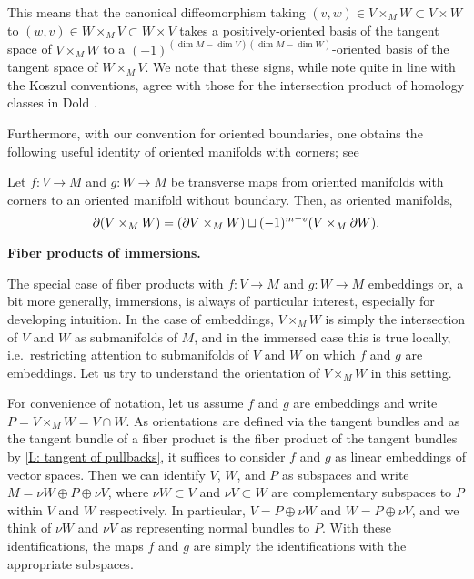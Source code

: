 This means that the canonical diffeomorphism taking $(v,w) \in V \times_M W \subset V \times W$ to $(w,v) \in W \times_M V \subset W \times V$ takes a positively-oriented basis of the tangent space of $V \times_M W$ to a $(-1)^{(\dim M-\dim V)(\dim M-\dim W)}$-oriented basis of the tangent space of $W \times_M V$.
We note that these signs, while note quite in line with the Koszul conventions, agree with those for the intersection product of homology classes in Dold \cite[Section VIII.13]{Dol72}.

Furthermore, with our convention for oriented boundaries, one obtains the following useful identity of oriented manifolds with corners; see \cite[Propositions 7.4 and 7.5]{Joy12}

\begin{proposition}\label{P: oriented fiber boundary}
	Let $f \colon V \to M$ and $g \colon W \to M$ be transverse maps from oriented manifolds with corners to an oriented manifold without boundary.
	Then, as oriented manifolds,
	\begin{equation*}
		\partial (V \times_M W) = (\partial V \times_M W) \sqcup (-1)^{m-v}(V \times_M \partial W).
	\end{equation*}
\end{proposition}

\medskip\noindent\textbf{Fiber products of immersions.}

The special case of fiber products with $f \colon V \to M$ and $g \colon W \to M$ embeddings or, a bit more generally, immersions, is always of particular interest, especially for developing intuition.
In the case of embeddings, $V \times_M W$ is simply the intersection of $V$ and $W$ as submanifolds of $M$, and in the immersed case this is true locally, i.e.\ restricting attention to submanifolds of $V$ and $W$ on which $f$ and $g$ are embeddings.
Let us try to understand the orientation of $V \times_M W$ in this setting.

For convenience of notation, let us assume $f$ and $g$ are embeddings and write $P = V \times_M W = V \cap W$.
As orientations are defined via the tangent bundles and as the tangent bundle of a fiber product is the fiber product of the tangent bundles by \cref{L: tangent of pullbacks}, it suffices to consider $f$ and $g$ as linear embeddings of vector spaces.
Then we can identify $V$, $W$, and $P$ as subspaces and write $M = \nu W \oplus P \oplus \nu V$, where $\nu W \subset V$ and $\nu V \subset W$ are complementary subspaces to $P$ within $V$ and $W$ respectively.
In particular, $V = P \oplus \nu W$ and $W = P \oplus \nu V$, and we think of $\nu W$ and $\nu V$ as representing normal bundles to $P$.
With these identifications, the maps $f$ and $g$ are simply the identifications with the appropriate subspaces.

